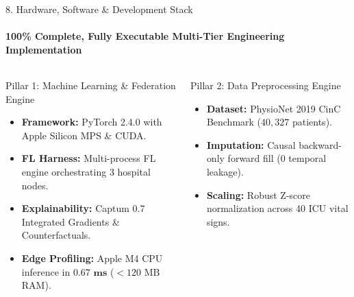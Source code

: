 \documentclass[aspectratio=169, 10pt]{beamer}
\begin{document}
\begin{frame}{8. Hardware, Software \& Development Stack}
    \framesubtitle{100\% Complete, Fully Executable Multi-Tier Engineering Implementation}
    \begin{columns}[T]
        \begin{block}{Pillar 1: Machine Learning \& Federation Engine}
            \scriptsize
            \begin{itemize}
                \setlength\itemsep{0.05em}
                \item \textbf{Framework:} PyTorch 2.4.0 with Apple Silicon MPS \& CUDA.
                \item \textbf{FL Harness:} Multi-process FL engine orchestrating 3 hospital nodes.
                \item \textbf{Explainability:} Captum 0.7 Integrated Gradients \& Counterfactuals.
                \item \textbf{Edge Profiling:} Apple M4 CPU inference in $\mathbf{0.67\text{ ms}}$ ($<120\text{ MB}$ RAM).
            \end{itemize}
        \end{block}
        \vspace{-0.1cm}
        \begin{block}{Pillar 2: Data Preprocessing Engine}
            \scriptsize
            \begin{itemize}
                \setlength\itemsep{0.05em}
                \item \textbf{Dataset:} PhysioNet 2019 CinC Benchmark ($40,327$ patients).
                \item \textbf{Imputation:} Causal backward-only forward fill (0 temporal leakage).
                \item \textbf{Scaling:} Robust Z-score normalization across 40 ICU vital signs.
            \end{itemize}
        \end{block}


\end{columns}
\end{frame}
\end{document}
